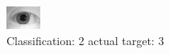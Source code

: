 \begin{figure}[h!]
\begin{center}
\includegraphics[width=0.60\columnwidth]{figures/ID1070_class_2_target_3.png}
\end{center}
\caption{ Classification: 2 actual target: 3}
\label{fig:ID1070_class_2_target_3}
\end{figure}
